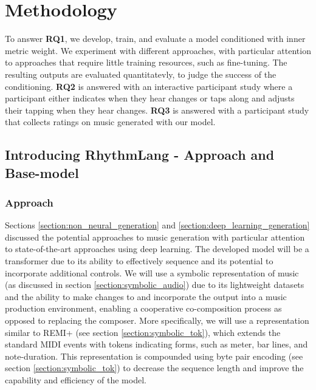 \chapter{Methodology}
To answer \textbf{RQ1}, we develop, train, and evaluate a model conditioned with inner metric weight. We experiment with different approaches, with particular attention to approaches that require little training resources, such as fine-tuning. 
The resulting outputs are evaluated quantitatevly, to judge the success of the conditioning.
\textbf{RQ2} is answered with an interactive participant study where a participant either indicates when they hear changes or taps along and adjusts their tapping when they hear changes. \textbf{RQ3} is answered with a participant study that collects ratings on music generated with our model. 

\section{Introducing RhythmLang - Approach and Base-model}

\subsection{Approach}
Sections \ref{section:non_neural_generation} and \ref{section:deep_learning_generation} discussed the potential approaches to music generation with particular attention to state-of-the-art approaches using deep learning. The developed model will be a transformer due to its ability to effectively sequence and its potential to incorporate additional controls. We will use a symbolic representation of music (as discussed in section \ref{section:symbolic_audio}) due to its lightweight datasets and the ability to make changes to and incorporate the output into a music production environment, enabling a cooperative co-composition process as opposed to replacing the composer. More specifically, we will use a representation similar to REMI+ (see section \ref{section:symbolic_tok}), which extends the standard MIDI events with tokens indicating forms, such as meter, bar lines, and note-duration. This representation is compounded using byte pair encoding (see section \ref{section:symbolic_tok}) to decrease the sequence length and improve the capability and efficiency of the model. \\ 

